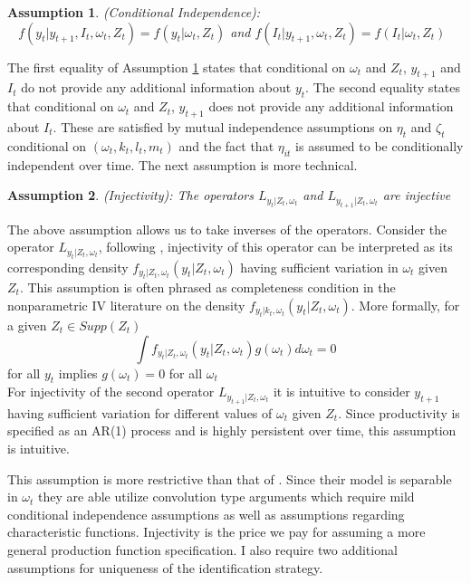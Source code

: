\documentclass{article}
\newtheorem{assump}{Assumption}[section]
\begin{document}
\begin{assump} (Conditional Independence):\\ \label{conditionalindependence}
~
$f(y_{t}|y_{t+1}, I_{t}, \omega_{t}, Z_{t})=f(y_{t}|\omega_{t}, Z_{t})$ and
$f(I_{t}|y_{t+1}, \omega_{t}, Z_{t})=f(I_{t}|\omega_{t}, Z_{t})$
\end{assump}
The first equality of Assumption \ref{conditionalindependence} states that conditional on $\omega_{t}$ and $Z_{t}$, $y_{t+1}$ and $I_{t}$ do not provide any additional information about $y_{t}$. The second equality states that conditional on $\omega_{t}$ and $Z_{t}$, $y_{t+1}$ does not provide any additional information about $I_{t}$. These are satisfied by mutual independence assumptions on $\eta_{t}$ and $\zeta_{t}$ conditional on $(\omega_{t}, k_{t}, l_{t}, m_{t})$ and the fact that $\eta_{it}$ is assumed to be conditionally independent over time. The next assumption is more technical.

\begin{assump} \label{injectivity} (Injectivity): The operators $L_{y_{t}|Z_{t}, \omega_{t}}$ and $L_{y_{t+1}|Z_{t}, \omega_{t}}$ are injective
\end{assump}

The above assumption allows us to take inverses of the operators. Consider the operator $L_{y_{t}|Z_{t}, \omega_{t}}$, following \cite{Hu2008}, injectivity of this operator can be interpreted as its corresponding density $f_{y_{t}|Z_{t}, \omega_{t}}(y_{t}|Z_{t}, \omega_{t})$ having sufficient variation in $\omega_{t}$ given $Z_{t}$. This assumption is often phrased as completeness condition in the nonparametric IV literature on the density $f_{y_{t}|k_{t}, \omega_{t}}(y_{t}|Z_{t}, \omega_{t})$. More formally, for a given $Z_{t}\in Supp(Z_{t})$
\begin{equation}
\int f_{y_{t}|Z_{t}, \omega_{t}}(y_{t}|Z_{t}, \omega_{t})g(\omega_{t})d\omega_{t}=0
\end{equation}
for all $y_{t}$ implies $g(\omega_{t})=0$ for all $\omega_{t}$\\

For injectivity of the second operator $L_{y_{t+1}|Z_{t}, \omega_{t}}$ it is intuitive to consider $y_{t+1}$ having sufficient variation for different values of $\omega_{t}$ given $Z_{t}$. Since productivity is specified as an AR(1) process and is highly persistent over time, this assumption is intuitive. 

This assumption is more restrictive than that of \cite{Hu2019}. Since their model is separable in $\omega_{t}$ they are able utilize convolution type arguments which require mild conditional independence assumptions as well as assumptions regarding characteristic functions. Injectivity is the price we pay for assuming a more general production function specification. I also require two additional assumptions for uniqueness of the identification strategy.
\end{document}
